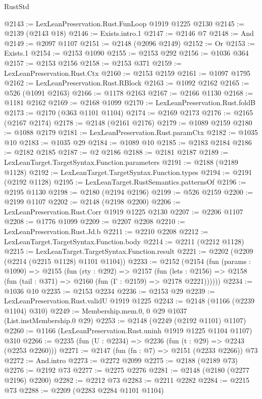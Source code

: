 \begin{lexlean}{RustStd}
\begin{coremodule}
@2143 := LexLeanPreservation.Rust.FunLoop @1919 @1225 @2130
@2145 := @2139 (@2143 @18)
@2146 := Exists.intro.{1}
@2147 := @2146 @7
@2148 := And
@2149 := @2097 @1107
@2151 := @2148 (@2096 @2149)
@2152 := Or
@2153 := Exists.{1}
@2154 := @2153 @1090
@2155 := @2153 @292
@2156 := @1036 @364
@2157 := @2153 @2156
@2158 := @2153 @371
@2159 := LexLeanPreservation.Rust.Ctx
@2160 := @2153 @2159
@2161 := @1097 @1795
@2162 := LexLeanPreservation.Rust.RBlock
@2163 := @1092 @2162
@2165 := @526 (@1091 @2163)
@2166 := @1178 @2163
@2167 := @2166 @1130
@2168 := @1181 @2162
@2169 := @2168 @1099
@2170 := LexLeanPreservation.Rust.foldB
@2173 := @2170 (@363 @1101 @1104)
@2174 := @2169 @2173
@2176 := @2165 (@2167 @2174)
@2178 := @2148 (@2161 @2176)
@2179 := @1089 @2159
@2180 := @1088 @2179
@2181 := LexLeanPreservation.Rust.paramCtx
@2182 := @1035 @10
@2183 := @1035 @29
@2184 := @1089 @10
@2185 := @2183 @2184
@2186 := @2182 @2185
@2187 := @2 @2186
@2188 := @2181 @2187
@2189 := LexLeanTarget.TargetSyntax.Function.parameters
@2191 := @2188 (@2189 @1128)
@2192 := LexLeanTarget.TargetSyntax.Function.types
@2194 := @2191 (@2192 @1128)
@2195 := LexLeanTarget.RustSemantics.patternsOf
@2196 := @2195 @1130
@2198 := @2180 (@2194 @2196)
@2199 := @526 @2159
@2200 := @2199 @1107
@2202 := @2148 (@2198 @2200)
@2206 := LexLeanPreservation.Rust.Corr @1919 @1225 @2130
@2207 := @2206 @1107
@2208 := @1776 @1099
@2209 := @2207 @2208
@2210 := LexLeanPreservation.Rust.Jd.b
@2211 := @2210 @2208
@2212 := LexLeanTarget.TargetSyntax.Function.body
@2214 := @2211 (@2212 @1128)
@2215 := LexLeanTarget.TargetSyntax.Function.result
@2221 := @2202 (@2209 (@2214 (@2215 @1128) @1101 @1104))
@2233 := @2152
    (@2154
      (fun (params : @1090) =>
      @2155
        (fun (rty : @292) =>
        @2157
          (fun (lets : @2156) =>
          @2158 (fun (tail : @371) => @2160 (fun (Γ : @2159) => @2178 @2221))))))
@2234 := @1036 @10
@2235 := @2153 @2234
@2236 := @2153 @29
@2239 := LexLeanPreservation.Rust.validU @1919 @1225
@2243 := @2148 (@1166 (@2239 @1104) @310)
@2249 := Membership.mem.{0, 0} @29 @1037 (List.instMembership.{0} @29)
@2253 := @2148 (@2249 (@2192 @1101) @1107)
@2260 := @1166 (LexLeanPreservation.Rust.uninh @1919 @1225 @1104 @1107) @310
@2266 := @2235 (fun (U : @2234) => @2236 (fun (t : @29) => @2243 (@2253 @2260)))
@2271 := @2147 (fun (fn : @7) => @2151 (@2233 @2266)) @73
@2272 := And.intro
@2273 := @2272 @2099
@2275 := @2188 (@2189 @73)
@2276 := @2192 @73
@2277 := @2275 @2276
@2281 := @2148 (@2180 (@2277 @2196) @2200)
@2282 := @2212 @73
@2283 := @2211 @2282
@2284 := @2215 @73
@2288 := @2209 (@2283 @2284 @1101 @1104)

\end{coremodule}
\end{lexlean}
